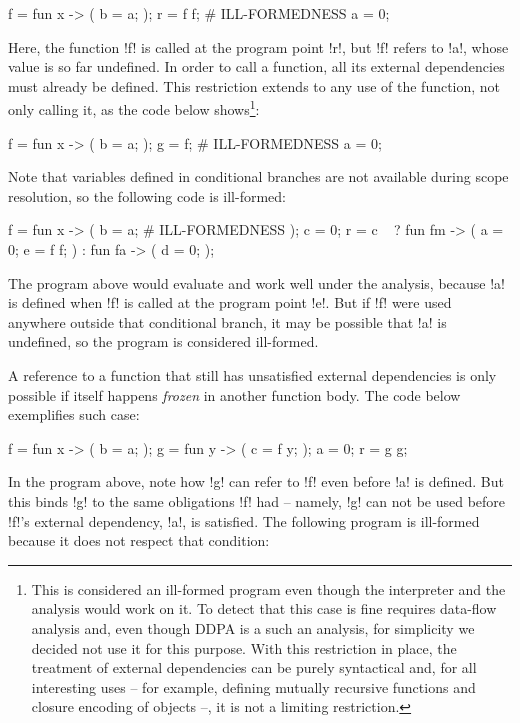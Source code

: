 \documentclass[nocopyright]{sigplanconf}
\begin{document}
\begin{plang}
f = fun x -> (
  b = a;
);
r = f f; # ILL-FORMEDNESS
a = 0;
\end{plang}

Here, the function \plangil!f! is called at the program point \plangil!r!, but \plangil!f! refers to \plangil!a!, whose value is so far undefined.  In order to call a function, all its external dependencies must already be defined.  This restriction extends to any use of the function, not only calling it, as the code below shows\footnote{This is considered an ill-formed program even though the interpreter and the analysis would work on it.  To detect that this case is fine requires data-flow analysis and, even though DDPA is a such an analysis, for simplicity we decided not use it for this purpose.  With this restriction in place, the treatment of external dependencies can be purely syntactical and, for all interesting uses -- for example, defining mutually recursive functions and closure encoding of objects --, it is not a limiting restriction.}:

\begin{plang}
f = fun x -> (
  b = a;
);
g = f; # ILL-FORMEDNESS
a = 0;
\end{plang}

Note that variables defined in conditional branches are not available during scope resolution, so the following code is ill-formed:

\begin{plang}
f = fun x -> (
  b = a; # ILL-FORMEDNESS
);
c = 0;
r = c ~ {} ?
    fun fm -> (
      a = 0;
      e = f f;
    ) : fun fa -> (
      d = 0;
    );
\end{plang}

The program above would evaluate and work well under the analysis, because \plangil!a! is defined when \plangil!f! is called at the program point \plangil!e!.  But if \plangil!f! were used anywhere outside that conditional branch, it may be possible that \plangil!a! is undefined, so the program is considered ill-formed.

A reference to a function that still has unsatisfied external dependencies is only possible if itself happens \emph{frozen} in another function body. The code below exemplifies such case:

\begin{plang}
f = fun x -> (
  b = a;
);
g = fun y -> (
  c = f y;
);
a = 0;
r = g g;
\end{plang}

In the program above, note how \plangil!g! can refer to \plangil!f! even before \plangil!a! is defined.  But this binds \plangil!g! to the same obligations \plangil!f! had -- namely, \plangil!g! can not be used before \plangil!f!'s external dependency, \plangil!a!, is satisfied.  The following program is ill-formed because it does not respect that condition:
\end{document}
